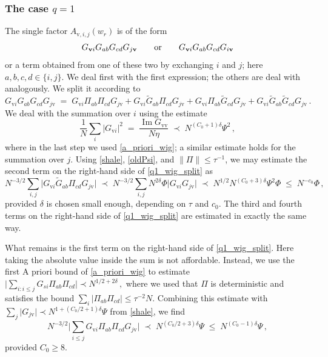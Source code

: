 \documentclass[11pt]{article} %
\numberwithin{equation}{section}
\numberwithin{figure}{section}
\theoremstyle{plain} %
\theoremstyle{definition} %
\newcommand{\f}[1]{\boldsymbol{\mathrm{#1}}} %
\newcommand{\wt}{\widetilde}
\newcommand{\txt}[1]{\text{\rm{#1}}}
\renewcommand{\leq}{\leqslant}
\renewcommand{\geq}{\geqslant}
\newcommand{\abs}[1]{\lvert #1 \rvert}
\newcommand{\absb}[1]{\bigl\lvert #1 \bigr\rvert}
\newcommand{\absbb}[1]{\biggl\lvert #1 \biggr\rvert}
\newcommand{\norm}[1]{\lVert #1 \rVert}
\DeclareMathOperator{\im}{Im}
\begin{document}
\subsubsection*{The case $q = 1$}
The single factor $A_{\f v,i,j }(w_r)$ is of the form
\begin{equation} \label{Wig_A_form}
G_{\f v i} G_{a b} G_{cd} G_{j \f v} \qquad \txt{or} \qquad G_{\f v i} G_{a b} G_{cd} G_{i \f v}
\end{equation}
or a term obtained from one of these two by exchanging $i$ and $j$;
here $a,b,c,d \in \{i,j\}$. We deal first with the first expression; the others are deal with analogously. We split it according to
\begin{equation} \label{q1_wig_split}
G_{\f v i} G_{a b} G_{cd} G_{j \f v} \;=\; G_{\f v i} \Pi_{a b} \Pi_{cd} G_{j \f v}
+ G_{\f v i} \wt G_{a b} \Pi_{cd} G_{j \f v}
+ G_{\f v i} \Pi_{a b} \wt G_{cd} G_{j \f v}
+ G_{\f v i} \wt G_{a b} \wt G_{cd} G_{j \f v}\,.
\end{equation}
We deal with the summation over $i$ using the estimate
\begin{equation} \label{shale}
\frac{1}{N} \sum_{i} \abs{G_{\f v i}}^2 \;=\; \frac{\im G_{\f v \f v}}{N \eta} \;\prec\; N^{(C_0 + 1) \delta} \Psi^2\,,
\end{equation}
where in the last step we used \eqref{a_priori_wig}; a similar estimate holds for the summation over $j$. Using \eqref{shale}, \eqref{oldPsi}, and $\norm{\Pi} \leq \tau^{-1}$, we may estimate the second term on the right-hand side of \eqref{q1_wig_split} as
\begin{equation*}
N^{-3/2} \sum_{i,j} \absb{G_{\f v i} \wt G_{a b} \Pi_{cd} G_{j \f v}} \;\prec\; N^{-3/2} \sum_{i,j} N^{2 \delta} \Phi \absb{G_{\f v i} G_{j \f v}} \;\prec\; N^{1/2} N^{(C_0 + 3) \delta} \Psi^2 \Phi \;\leq\; N^{-c_0} \Phi\,,
\end{equation*}
provided $\delta$ is chosen small enough, depending on $\tau$ and $c_0$. The third and fourth terms on the right-hand side of \eqref{q1_wig_split} are estimated in exactly the same way.

What remains is the first term on the right-hand side of \eqref{q1_wig_split}. Here taking the absolute value inside the sum is not affordable. Instead, we use the first A priori bound of \eqref{a_priori_wig} to estimate
$
\absb{\sum_{i : i \leq j} G_{si} \Pi_{ab} \Pi_{cd}} \prec N^{1/2 + 2 \delta}\,,
$
where we used that $\Pi$ is deterministic and satisfies the bound $\sum_{i} \abs{\Pi_{ab} \Pi_{cd}} \leq \tau^{-2} N$. Combining this estimate with $\sum_j \abs{G_{j \f v}} \prec N^{1 + (C_0/2 + 1) \delta} \Psi$ from \eqref{shale}, we find
\begin{equation*}
N^{-3/2} \absbb{\sum_{i \leq j} G_{\f v i} \Pi_{a b} \Pi_{cd} G_{j \f v}} \;\prec\; N^{(C_0 / 2 + 3) \delta} \Psi \;\leq\; N^{(C_0 - 1) \delta} \Psi\,,
\end{equation*}
provided $C_0 \geq 8$.
\end{document}
